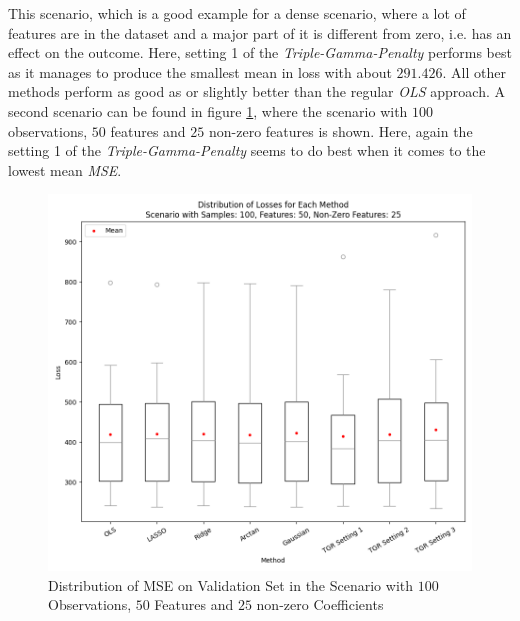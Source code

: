 \documentclass[12pt,a4paper]{article}
\begin{document}
This scenario, which is a good example for a dense scenario, where a lot of features are in the dataset and a major part of it is different from zero, i.e. has an effect on the outcome. Here, setting 1 of the \textit{Triple-Gamma-Penalty} performs best as it manages to produce the smallest mean in loss with about $291.426$. All other methods perform as good as or slightly better than the regular \textit{OLS} approach. A second scenario can be found in figure \ref{fig:SpecificScenario2}, where the scenario with $100$ observations, $50$ features and $25$ non-zero features is shown. Here, again the setting 1 of the \textit{Triple-Gamma-Penalty} seems to do best when it comes to the lowest mean \textit{MSE}.\\ 
\vfill

\begin{figure}[H]
\centering
\includegraphics[scale=0.6]{../02_simulation/021_simulation_figures/Boxplot_Scenario_100_50_25.png}
\caption{Distribution of MSE on Validation Set in the Scenario with $100$ Observations, $50$ Features and $25$ non-zero Coefficients}
\label{fig:SpecificScenario2}
\end{figure} 	
\end{document}
